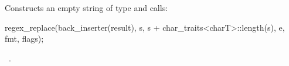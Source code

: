 \documentclass[ebook,11pt,article]{memoir}
\begin{document}
\begin{itemdescr}
\pnum
\effects  Constructs an empty string  of
type \tcode{>} and calls: 
\begin{codeblock}
regex_replace(back_inserter(result),
              s, s + char_traits<charT>::length(s), e, fmt, flags);
\end{codeblock}

\pnum
\returns\ .
\end{itemdescr}
\end{document}
